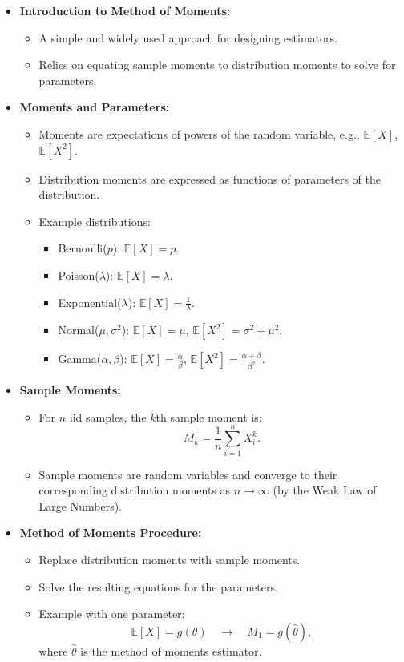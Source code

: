 \documentclass{article}
\begin{document}
\begin{itemize}
  \item \textbf{Introduction to Method of Moments:}
    \begin{itemize}
      \item A simple and widely used approach for designing estimators.
      \item Relies on equating sample moments to distribution moments to solve for parameters.
    \end{itemize}

  \item \textbf{Moments and Parameters:}
    \begin{itemize}
      \item Moments are expectations of powers of the random variable, e.g., $\mathbb{E}[X]$, $\mathbb{E}[X^2]$.
      \item Distribution moments are expressed as functions of parameters of the distribution.
      \item Example distributions:
        \begin{itemize}
          \item Bernoulli($p$): $\mathbb{E}[X] = p$.
          \item Poisson($\lambda$): $\mathbb{E}[X] = \lambda$.
          \item Exponential($\lambda$): $\mathbb{E}[X] = \frac{1}{\lambda}$.
          \item Normal($\mu, \sigma^2$): $\mathbb{E}[X] = \mu$, $\mathbb{E}[X^2] = \sigma^2 + \mu^2$.
          \item Gamma($\alpha, \beta$): $\mathbb{E}[X] = \frac{\alpha}{\beta}$, $\mathbb{E}[X^2] = \frac{\alpha + \beta}{\beta^2}$.
        \end{itemize}
    \end{itemize}

  \item \textbf{Sample Moments:}
    \begin{itemize}
      \item For $n$ iid samples, the $k$th sample moment is:
        \[
          M_k = \frac{1}{n} \sum_{i=1}^n X_i^k.
        \]
      \item Sample moments are random variables and converge to their corresponding distribution moments as $n \to \infty$ (by the Weak Law of Large Numbers).
    \end{itemize}

  \item \textbf{Method of Moments Procedure:}
    \begin{itemize}
      \item Replace distribution moments with sample moments.
      \item Solve the resulting equations for the parameters.
      \item Example with one parameter:
        \[
          \mathbb{E}[X] = g(\theta) \quad \to \quad M_1 = g(\hat{\theta}),
        \]
        where $\hat{\theta}$ is the method of moments estimator.
    \end{itemize}


\end{itemize}
\end{document}
